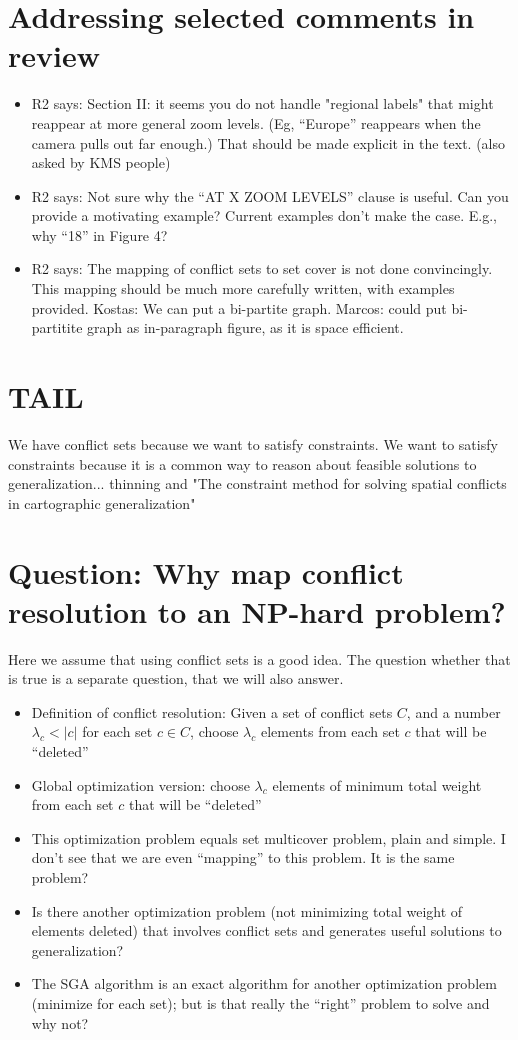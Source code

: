 \documentclass[11pt, oneside]{article}   	%
\begin{document}
\section{Addressing selected comments in review}

\begin{itemize}
\item R2 says:  Section II: it seems you do not handle "regional labels" that might reappear at more general zoom levels. (Eg, ``Europe'' reappears when the camera pulls out far enough.) That should be made explicit in the text. (also asked by KMS people)
\item R2 says: Not sure why the ``AT X ZOOM LEVELS'' clause is useful. Can you provide a motivating example? Current examples don't make the case. E.g., why ``18'' in Figure 4?
\item R2 says: The mapping of conflict sets to set cover is not done convincingly. This mapping should be much more carefully written, with examples provided. Kostas: We can put a bi-partite graph. Marcos: could put bi-partitite graph as in-paragraph figure, as it is space efficient.
\end{itemize}

\section{TAIL}

We have conflict sets because we want to satisfy constraints. We want to satisfy constraints because it is a common way to reason about feasible solutions to generalization... thinning and "The constraint method for solving spatial conflicts in cartographic generalization"


\section{Question: Why map conflict resolution to an NP-hard problem?}
Here we assume that using conflict sets is a good idea. The question whether that is true is a separate question, that we will also answer.
\begin{itemize}
\item Definition of conflict resolution: Given a set of conflict sets $C$, and a number $\lambda_c < \left\vert c \right\vert$ for each set $c \in C$, choose $\lambda_c$ elements from each set $c$ that will be ``deleted'' 
\item Global optimization version: choose $\lambda_c$ elements of minimum total weight from each set $c$ that will be ``deleted'' 
\item This optimization problem equals set multicover problem, plain and simple. I don't see that we are even ``mapping'' to this problem. It is the same problem?
\item Is there another optimization problem (not minimizing total weight of elements deleted) that involves conflict sets and generates useful solutions to generalization?
\item The SGA algorithm is an exact algorithm for another optimization problem (minimize for each set); but is that really the ``right'' problem to solve and why not?
\end{itemize}
\end{document}
